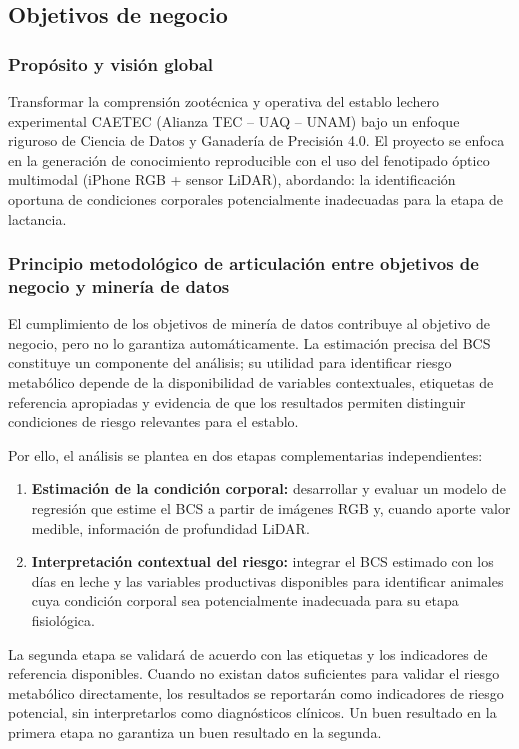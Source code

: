 \subsection{Objetivos de negocio}

\subsubsection{Propósito y visión global}

Transformar la comprensión zootécnica y operativa del establo lechero experimental CAETEC (Alianza TEC -- UAQ -- UNAM) bajo un enfoque riguroso de Ciencia de Datos y Ganadería de Precisión 4.0. El proyecto se enfoca en la generación de conocimiento reproducible con el uso del fenotipado óptico multimodal (iPhone RGB + sensor LiDAR), abordando: la identificación oportuna de condiciones corporales potencialmente inadecuadas para la etapa de lactancia.

\subsubsection{Principio metodológico de articulación entre objetivos de negocio y minería de datos}

El cumplimiento de los objetivos de minería de datos contribuye al objetivo de negocio, pero no lo garantiza automáticamente. La estimación precisa del BCS constituye un componente del análisis; su utilidad para identificar riesgo metabólico depende de la disponibilidad de variables contextuales, etiquetas de referencia apropiadas y evidencia de que los resultados permiten distinguir condiciones de riesgo relevantes para el establo.

Por ello, el análisis se plantea en dos etapas complementarias independientes:

\begin{enumerate}
  \item \textbf{Estimación de la condición corporal:} desarrollar y evaluar un modelo de regresión que estime el BCS a partir de imágenes RGB y, cuando aporte valor medible, información de profundidad LiDAR.
  \item \textbf{Interpretación contextual del riesgo:} integrar el BCS estimado con los días en leche y las variables productivas disponibles para identificar animales cuya condición corporal sea potencialmente inadecuada para su etapa fisiológica.
\end{enumerate}

La segunda etapa se validará de acuerdo con las etiquetas y los indicadores de referencia disponibles. Cuando no existan datos suficientes para validar el riesgo metabólico directamente, los resultados se reportarán como indicadores de riesgo potencial, sin interpretarlos como diagnósticos clínicos. Un buen resultado en la primera etapa no garantiza un buen resultado en la segunda.

